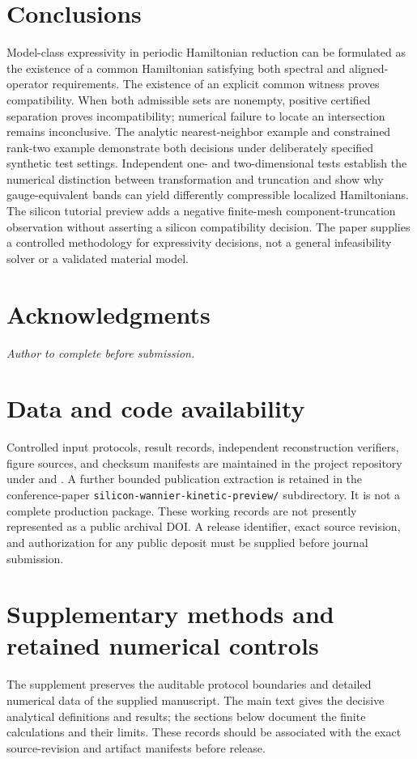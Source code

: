 \documentclass[11pt]{article}
\begin{document}
\section{Conclusions}
Model-class expressivity in periodic Hamiltonian reduction can be formulated as the existence of a common Hamiltonian satisfying both spectral and aligned-operator requirements. The existence of an explicit common witness proves compatibility. When both admissible sets are nonempty, positive certified separation proves incompatibility; numerical failure to locate an intersection remains inconclusive. The analytic nearest-neighbor example and constrained rank-two example demonstrate both decisions under deliberately specified synthetic test settings. Independent one- and two-dimensional tests establish the numerical distinction between transformation and truncation and show why gauge-equivalent bands can yield differently compressible localized Hamiltonians. The silicon tutorial preview adds a negative finite-mesh component-truncation observation without asserting a silicon compatibility decision. The paper supplies a controlled methodology for expressivity decisions, not a general infeasibility solver or a validated material model.

\section*{Acknowledgments}
\emph{Author to complete before submission.}
\section*{Data and code availability}
{\sloppy
Controlled input protocols, result records, independent reconstruction verifiers, figure sources, and checksum manifests are maintained in the project repository under  and . A further bounded publication extraction is retained in the conference-paper \texttt{silicon-wannier-kinetic-preview/} subdirectory. It is not a complete production package. These working records are not presently represented as a public archival DOI. A release identifier, exact source revision, and authorization for any public deposit must be supplied before journal submission.
\par}

\clearpage\appendix
\section{Supplementary methods and retained numerical controls}
The supplement preserves the auditable protocol boundaries and detailed numerical data of the supplied manuscript. The main text gives the decisive analytical definitions and results; the sections below document the finite calculations and their limits. These records should be associated with the exact source-revision and artifact manifests before release.
\end{document}
